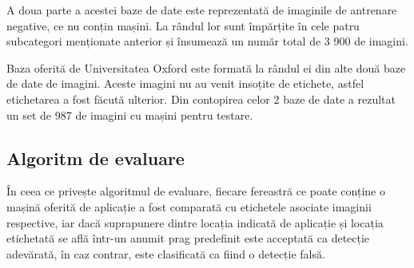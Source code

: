 A doua parte a acestei baze de date este reprezentată de imaginile de antrenare negative, ce nu conțin mașini. La rândul lor sunt împărțite în cele patru subcategori menționate anterior și însumează un număr total de 3 900 de imagini.

Baza oferită de Universitatea Oxford este formată la rândul ei din alte două baze de date de imagini. Aceste imagini nu au venit insoțite de etichete, astfel etichetarea a fost făcută ulterior. Din contopirea celor 2 baze de date a rezultat un set de 987 de imagini cu mașini pentru testare.

\subsection*{Algoritm de evaluare}

În ceea ce privește algoritmul de evaluare, fiecare fereastră ce poate conține o mașină oferită de aplicație a fost comparată cu etichetele asociate imaginii respective, iar dacă suprapunere dintre locația indicată de aplicație și locația etichetată se află într-un anumit prag predefinit este acceptată ca detecție adevărată, în caz contrar, este clasificată ca fiind o detecție falsă.